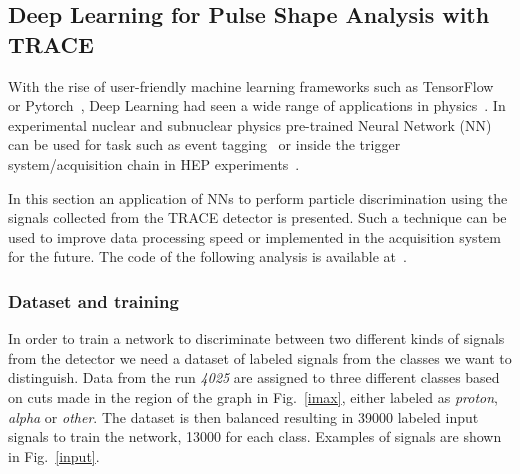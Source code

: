 \subsection{Deep Learning for Pulse Shape Analysis with TRACE} \label{deep}
With the rise of user-friendly machine learning frameworks such as TensorFlow~\cite{tensorflow} or Pytorch~\cite{pytorch}, Deep Learning had seen a wide range of applications in physics~\cite{ml4phys}. In experimental nuclear and subnuclear physics pre-trained Neural Network (NN) can be used for task such as event tagging~\cite{baldi} or inside the trigger system/acquisition chain in HEP experiments~\cite{williams}. 


In this section an application of NNs to perform particle discrimination using the signals collected from the TRACE detector is presented. Such a technique can be used to improve data processing speed or implemented in the acquisition system for the future.
The code of the following analysis is available at~\cite{github-nn}.

\subsubsection{Dataset and training}

In order to train a network to discriminate between two different kinds of signals from the detector we need a dataset of labeled signals from the classes we want to distinguish. Data from the run \emph{4025} are assigned to three different classes based on cuts made in the region of the graph in Fig.~\ref{imax}, either labeled as \emph{proton}, \emph{alpha} or \emph{other}. The dataset is then balanced resulting in \num{39000} labeled input signals to train the network, \num{13000} for each class. Examples of signals are shown in Fig.~\ref{input}.

